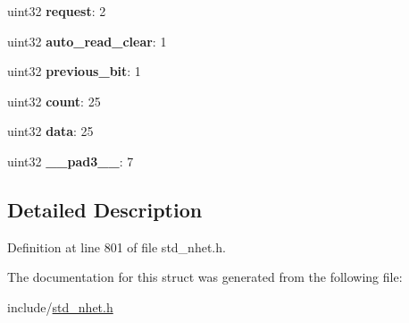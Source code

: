 \begin{DoxyCompactItemize}
\item 
\mbox{\label{structapcnt__format_a0aef4b42caccecc074f2ec52854200b7}} 
uint32 {\bfseries request}\+: 2
\item 
\mbox{\label{structapcnt__format_a1a35bf4dbb2e3d1b1544afd447e29320}} 
uint32 {\bfseries auto\+\_\+read\+\_\+clear}\+: 1
\item 
\mbox{\label{structapcnt__format_afd64f21deb21d6ae12a8586082556c1d}} 
uint32 {\bfseries previous\+\_\+bit}\+: 1
\item 
\mbox{\label{structapcnt__format_af7cbf719321fa1ded691d89dbedc426c}} 
uint32 {\bfseries count}\+: 25
\item 
\mbox{\label{structapcnt__format_a3952d227d4ba00152b094ef2431c9541}} 
uint32 {\bfseries data}\+: 25
\item 
\mbox{\label{structapcnt__format_a23e64e9d683f24444ac45e57c1060b7e}} 
uint32 {\bfseries \+\_\+\+\_\+pad3\+\_\+\+\_\+}\+: 7
\end{DoxyCompactItemize}


\subsection{Detailed Description}


Definition at line 801 of file std\+\_\+nhet.\+h.



The documentation for this struct was generated from the following file\+:\begin{DoxyCompactItemize}
\item 
include/\mbox{\hyperlink{std__nhet_8h}{std\+\_\+nhet.\+h}}\end{DoxyCompactItemize}
